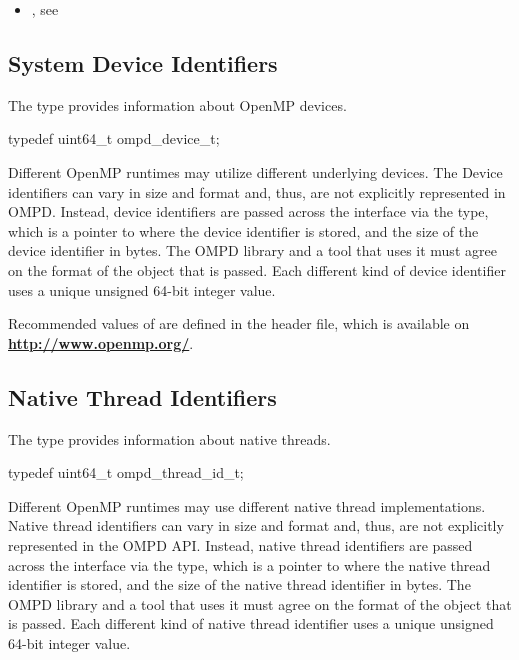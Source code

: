 \crossreferences
\begin{itemize}
\item {}, 
see 
\end{itemize}

\subsection{System Device Identifiers}
\label{ompd:omp_device_t}

\summary
The  type provides information about OpenMP devices.

\format
\begin{ccppspecific}
\begin{ompSyntax}
typedef uint64_t ompd_device_t;
\end{ompSyntax}
\end{ccppspecific}
\descr
Different OpenMP runtimes may utilize different underlying devices. The 
Device identifiers can vary in size and format and, thus, are not explicitly 
represented in OMPD. Instead, device identifiers are passed across the interface 
via the  type, which is a pointer to where the device 
identifier is stored, and the size of the device identifier in bytes. The 
OMPD library and a tool that uses it must agree on the format of the object 
that is passed. Each different kind of device identifier uses a unique 
unsigned 64-bit integer value.

Recommended values of  are defined in the 
header file, which is available on \textbf{\url{http://www.openmp.org/}}.



\subsection{Native Thread Identifiers}
\label{ompd:ompd_thread_id_t}

\summary
The  type provides information about native threads.

\format
\begin{ccppspecific}
\begin{ompSyntax}
typedef uint64_t ompd_thread_id_t;
\end{ompSyntax}
\end{ccppspecific}

\descr
Different OpenMP runtimes may use different native thread implementations.
Native thread identifiers can vary in size and format and, thus, are not 
explicitly represented in the OMPD API. Instead, native thread identifiers 
are passed across the interface via the  type, which 
is a pointer to where the native thread identifier is stored, and the size 
of the native thread identifier in bytes. The OMPD library and a tool that 
uses it must agree on the format of the object that is passed. Each different 
kind of native thread identifier uses a unique unsigned 64-bit integer value.

